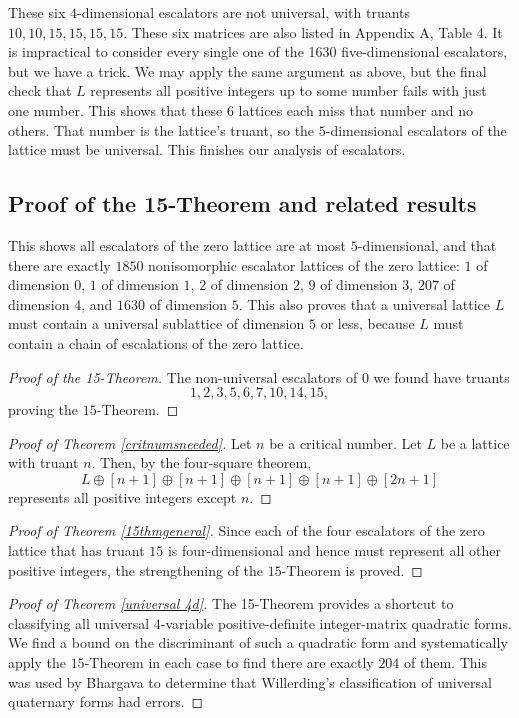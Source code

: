 \documentclass[letterpaper, 12pt]{article}
\begin{document}
These six $4$-dimensional escalators are not universal, with truants $10,10,15,15,15,15$. These six matrices are also listed in Appendix A, Table 4. It is impractical to consider every single one of the 1630 five-dimensional escalators, but we have a trick. We may apply the same argument as above, but the final check that $L$ represents all positive integers up to some number fails with just one number. This shows that these $6$ lattices each miss that number and no others. That number is the lattice's truant, so the $5$-dimensional escalators of the lattice must be universal. This finishes our analysis of escalators.

\subsection{Proof of the 15-Theorem and related results}
This shows all escalators of the zero lattice are at most $5$-dimensional, and that there are exactly $1850$ nonisomorphic escalator lattices of the zero lattice: $1$ of dimension $0$, $1$ of dimension $1$, $2$ of dimension $2$, $9$ of dimension $3$, $207$ of dimension $4$, and $1630$ of dimension $5$. This also proves that a universal lattice $L$ must contain a universal sublattice of dimension $5$ or less, because $L$ must contain a chain of escalations of the zero lattice.

\begin{proof}[Proof of the 15-Theorem]
    The non-universal escalators of $0$ we found have truants \[1, 2, 3, 5, 6, 7, 10, 14, 15,\] proving the $15$-Theorem.
\end{proof}
\begin{proof}[Proof of Theorem \ref{critnumsneeded}]
    Let $n$ be a critical number. Let $L$ be a lattice with truant $n$. Then, by the four-square theorem,
    \[L \oplus [n + 1] \oplus [n + 1] \oplus [n + 1] \oplus [n + 1] \oplus [2n + 1]\]
    represents all positive integers except $n$.
\end{proof}
\begin{proof}[Proof of Theorem \ref{15thmgeneral}]
    Since each of the four escalators of the zero lattice that has truant $15$ is four-dimensional and hence must represent all other positive integers, the strengthening of the $15$-Theorem is proved.
\end{proof}

\begin{proof}[Proof of Theorem \ref{universal 4d}]
The 15-Theorem provides a shortcut to classifying all universal $4$-variable positive-definite integer-matrix quadratic forms. We find a bound on the discriminant of such a quadratic form and systematically apply the $15$-Theorem in each case to find there are exactly $204$ of them. This was used by Bhargava to determine that Willerding's classification of universal quaternary forms had errors.
\end{proof}
\end{document}
